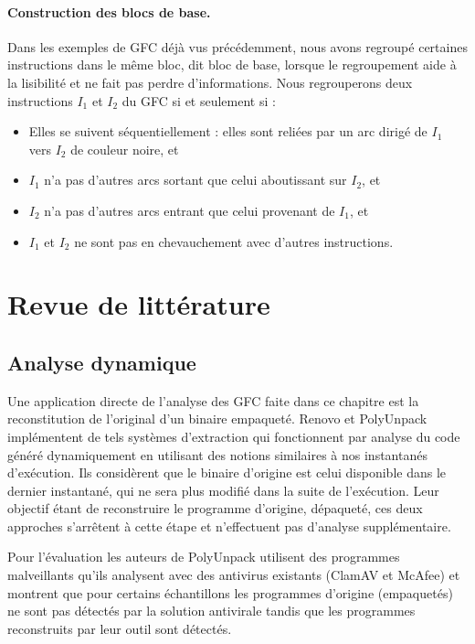 \paragraph{Construction des blocs de base.}
Dans les exemples de GFC déjà vus précédemment, nous avons regroupé certaines instructions dans le même bloc, dit bloc de base, lorsque le regroupement aide à la lisibilité et ne fait pas perdre d'informations. Nous regrouperons deux instructions $I_1$ et $I_2$ du GFC si et seulement si :
\begin{itemize}
 \item Elles se suivent séquentiellement : elles sont reliées par un arc dirigé de $I_1$ vers $I_2$ de couleur noire, et
 \item $I_1$ n'a pas d'autres arcs sortant que celui aboutissant sur $I_2$, et
 \item $I_2$ n'a pas d'autres arcs entrant que celui provenant de $I_1$, et
 \item $I_1$ et $I_2$ ne sont pas en chevauchement avec d'autres instructions.
\end{itemize}

\section{Revue de littérature}
\subsection{Analyse dynamique}
Une application directe de l'analyse des GFC faite dans ce chapitre est la reconstitution de l'original d'un binaire empaqueté.
Renovo \cite{renovo} et PolyUnpack \cite{polyunpack} implémentent de tels systèmes d'extraction qui fonctionnent par analyse du code généré dynamiquement en utilisant des notions similaires à nos instantanés d'exécution. Ils considèrent que le binaire d'origine est celui disponible dans le dernier instantané, qui ne sera plus modifié dans la suite de l'exécution.
Leur objectif étant de reconstruire le programme d'origine, dépaqueté, ces deux approches s'arrêtent à cette étape et n'effectuent pas d'analyse supplémentaire. 

Pour l'évaluation les auteurs de PolyUnpack utilisent des programmes malveillants qu'ils analysent avec des antivirus existants (ClamAV et McAfee) et montrent que pour certains échantillons les programmes d'origine (empaquetés) ne sont pas détectés par la solution antivirale tandis que les programmes reconstruits par leur outil sont détectés.

